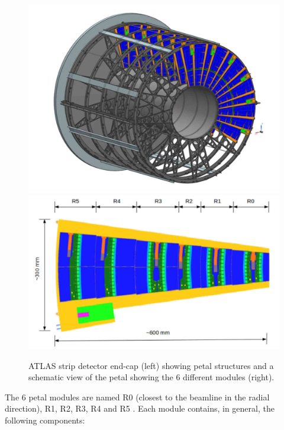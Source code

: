 		\begin{figure}[ht!]
			\centering
			\captionsetup{justification=centering,margin=2cm}
			\includegraphics[scale=0.25]{Figures/Chapter02/EndCap.jpg}
			\includegraphics[scale=0.26]{Figures/Chapter02/PetalDesign.jpg}
			\caption{ATLAS strip detector end-cap (left) showing petal structures and a schematic view of the petal showing the 6 different modules (right).}\label{fig2.1}
		\end{figure}
		
		The 6 petal modules are named R0 (closest to the beamline in the radial direction), R1, R2, R3, R4 and R5 . Each module contains, in general, the following components:
		
